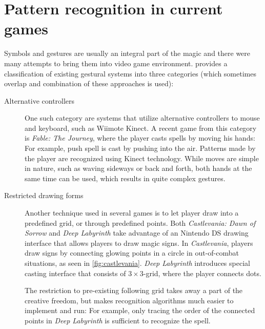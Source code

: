 \section{Pattern recognition in current games}

Symbols and gestures are usually an integral part of the magic and there were many attempts to bring them into video game environment. \citet{gameMagic} provides a classification of existing gestural systems into three categories (which sometimes overlap and combination of these approaches is used):

\begin{description}
\item[Alternative controllers]
One such category are systems that utilize alternative controllers to mouse and keyboard, such as Wiimote Kinect. A recent game from this category is \emph{Fable: The Journey}, where the player casts spells by moving his hands: For example, push spell is cast by pushing into the air. Patterns made by the player are recognized using Kinect technology. While moves are simple in nature, such as waving sideways or back and forth, both hands at the same time can be used, which results in quite complex gestures.

\item[Restricted drawing forms]
Another technique used in several games is to let player draw into a predefined grid, or through predefined points. Both \emph{Castlevania: Dawn of Sorrow} and \emph{Deep Labyrinth} take advantage of an Nintendo DS drawing interface that allows players to draw magic signs. 
In \emph{Castlevania}, players draw signs by connecting glowing points in a circle in out-of-combat situations, as seen in \cref{fig:castlevania}. \emph{Deep Labyrinth} introduces special casting interface that consists of $3\times 3$-grid, where the player connects dots.

The restriction to pre-existing following grid takes away a part of the creative freedom, but makes recognition algorithms much easier to implement and run: For example, only tracing the order of the connected points in \emph{Deep Labyrinth} is sufficient to recognize the spell.


\end{description}
